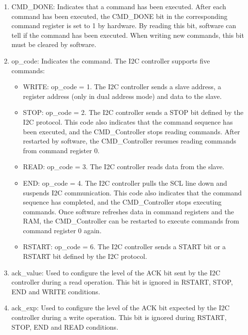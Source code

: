 \documentclass[main\_\_EN.tex]{subfiles}
\begin{document}
\begin{enumerate}

\item CMD\_DONE: Indicates that a command has been executed. After each command has been executed, the CMD\_DONE bit in the corresponding command register is set to 1 by hardware. By reading this bit, software can tell if the command has been executed. When writing new commands, this bit must be cleared by software.

\item op\_code: Indicates the command. The I2C controller supports five commands:

\begin{itemize}

    \item WRITE: op\_code = 1. The I2C controller sends a slave address, a register address  (only in dual address mode) and data to the slave.
    
    \item STOP: op\_code = 2. The I2C controller sends a STOP bit defined by the I2C protocol. This code also indicates that the command sequence has been executed, and the CMD\_Controller stops reading commands. After restarted by software, the CMD\_Controller resumes reading commands from command register 0.
    
    \item READ: op\_code = 3. The I2C controller reads data from the slave.
    
    \item END: op\_code = 4. The I2C controller pulls the SCL line down and suspends I2C communication. This code also indicates that the command sequence has completed, and the CMD\_Controller stops executing commands. Once software refreshes data in command registers and the RAM, the CMD\_Controller can be restarted to execute commands from command register 0 again. 

    \item RSTART: op\_code = 6. The I2C controller sends a START bit or a RSTART bit defined by the I2C protocol.
    
\end{itemize}

\item ack\_value: Used to configure the level of the ACK bit sent by the I2C controller during a read operation. This bit is ignored in RSTART, STOP, END and WRITE conditions.

\item ack\_exp: Used to configure the level of the ACK bit expected by the I2C controller during a write operation. This bit is ignored during RSTART, STOP, END and READ conditions.


\end{enumerate}
\end{document}
